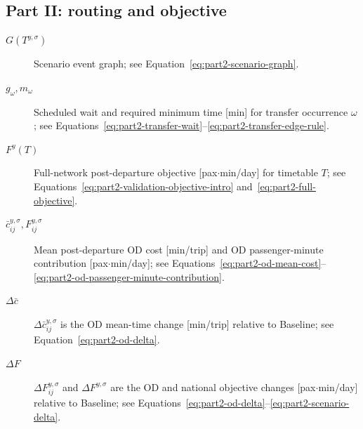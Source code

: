 \documentclass[preprint,12pt]{elsarticle}
\begin{document}
\subsection*{Part II: routing and objective}
\begin{description}
    \item[$G(T^{y,\sigma})$] Scenario event graph; see Equation~\eqref{eq:part2-scenario-graph}.
    \item[$g_\omega,m_\omega$] Scheduled wait and required minimum time [min] for transfer occurrence \(\omega\); see Equations~\eqref{eq:part2-transfer-wait}--\eqref{eq:part2-transfer-edge-rule}.
    \item[$F^y(T)$] Full-network post-departure objective [pax\(\cdot\)min/day] for timetable \(T\); see Equations~\eqref{eq:part2-validation-objective-intro} and~\eqref{eq:part2-full-objective}.
    \item[$\bar c_{ij}^{y,\sigma},F_{ij}^{y,\sigma}$] Mean post-departure OD cost [min/trip] and OD passenger-minute contribution [pax\(\cdot\)min/day]; see Equations~\eqref{eq:part2-od-mean-cost}--\eqref{eq:part2-od-passenger-minute-contribution}.
    \item[$\Delta\bar c$] \(\Delta\bar c_{ij}^{y,\sigma}\) is the OD mean-time change [min/trip] relative to Baseline; see Equation~\eqref{eq:part2-od-delta}.
    \item[$\Delta F$] \(\Delta F_{ij}^{y,\sigma}\) and \(\Delta F^{y,\sigma}\) are the OD and national objective changes [pax\(\cdot\)min/day] relative to Baseline; see Equations~\eqref{eq:part2-od-delta}--\eqref{eq:part2-scenario-delta}.
\end{description}
\end{document}
